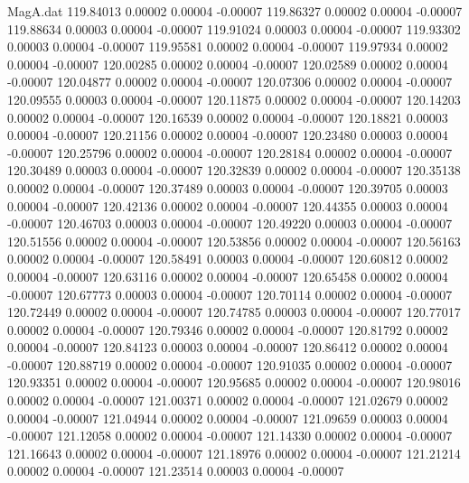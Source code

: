 \begin{filecontents}{MagA.dat}
 119.84013    0.00002    0.00004   -0.00007
 119.86327    0.00002    0.00004   -0.00007
 119.88634    0.00003    0.00004   -0.00007
 119.91024    0.00003    0.00004   -0.00007
 119.93302    0.00003    0.00004   -0.00007
 119.95581    0.00002    0.00004   -0.00007
 119.97934    0.00002    0.00004   -0.00007
 120.00285    0.00002    0.00004   -0.00007
 120.02589    0.00002    0.00004   -0.00007
 120.04877    0.00002    0.00004   -0.00007
 120.07306    0.00002    0.00004   -0.00007
 120.09555    0.00003    0.00004   -0.00007
 120.11875    0.00002    0.00004   -0.00007
 120.14203    0.00002    0.00004   -0.00007
 120.16539    0.00002    0.00004   -0.00007
 120.18821    0.00003    0.00004   -0.00007
 120.21156    0.00002    0.00004   -0.00007
 120.23480    0.00003    0.00004   -0.00007
 120.25796    0.00002    0.00004   -0.00007
 120.28184    0.00002    0.00004   -0.00007
 120.30489    0.00003    0.00004   -0.00007
 120.32839    0.00002    0.00004   -0.00007
 120.35138    0.00002    0.00004   -0.00007
 120.37489    0.00003    0.00004   -0.00007
 120.39705    0.00003    0.00004   -0.00007
 120.42136    0.00002    0.00004   -0.00007
 120.44355    0.00003    0.00004   -0.00007
 120.46703    0.00003    0.00004   -0.00007
 120.49220    0.00003    0.00004   -0.00007
 120.51556    0.00002    0.00004   -0.00007
 120.53856    0.00002    0.00004   -0.00007
 120.56163    0.00002    0.00004   -0.00007
 120.58491    0.00003    0.00004   -0.00007
 120.60812    0.00002    0.00004   -0.00007
 120.63116    0.00002    0.00004   -0.00007
 120.65458    0.00002    0.00004   -0.00007
 120.67773    0.00003    0.00004   -0.00007
 120.70114    0.00002    0.00004   -0.00007
 120.72449    0.00002    0.00004   -0.00007
 120.74785    0.00003    0.00004   -0.00007
 120.77017    0.00002    0.00004   -0.00007
 120.79346    0.00002    0.00004   -0.00007
 120.81792    0.00002    0.00004   -0.00007
 120.84123    0.00003    0.00004   -0.00007
 120.86412    0.00002    0.00004   -0.00007
 120.88719    0.00002    0.00004   -0.00007
 120.91035    0.00002    0.00004   -0.00007
 120.93351    0.00002    0.00004   -0.00007
 120.95685    0.00002    0.00004   -0.00007
 120.98016    0.00002    0.00004   -0.00007
 121.00371    0.00002    0.00004   -0.00007
 121.02679    0.00002    0.00004   -0.00007
 121.04944    0.00002    0.00004   -0.00007
 121.09659    0.00003    0.00004   -0.00007
 121.12058    0.00002    0.00004   -0.00007
 121.14330    0.00002    0.00004   -0.00007
 121.16643    0.00002    0.00004   -0.00007
 121.18976    0.00002    0.00004   -0.00007
 121.21214    0.00002    0.00004   -0.00007
 121.23514    0.00003    0.00004   -0.00007

\end{filecontents}
